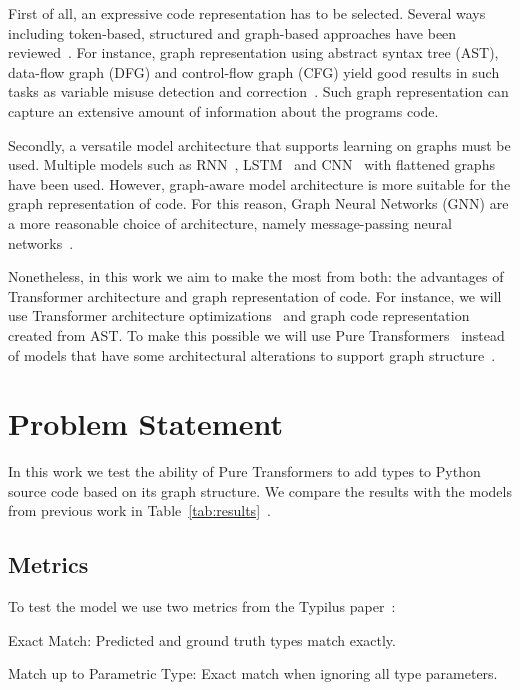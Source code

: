 \documentclass[conference]{IEEEtran}
\begin{document}
First of all, an expressive code representation has to be selected.
Several ways including token-based, structured and graph-based approaches have been reviewed~\cite{sm_avdoshin_code_2022}.
For instance, graph representation using abstract syntax tree (AST), data-flow graph (DFG) and control-flow graph (CFG)
yield good results in such tasks as variable misuse detection and correction~\cite{allamanis_learning_2017}.
Such graph representation can capture an extensive amount of information about the programs code.

Secondly, a versatile model architecture that supports learning on graphs must be used.
Multiple models such as RNN~\cite{white_deep_2016}, LSTM~\cite{wei_supervised_2017} and CNN~\cite{mou_convolutional_2016} with flattened graphs have been used.
However, graph-aware model architecture is more suitable for the graph representation of code.
For this reason, Graph Neural Networks (GNN) are a more reasonable choice of architecture,
namely message-passing neural networks~\cite{allamanis_learning_2017}.

Nonetheless, in this work we aim to make the most from both: the advantages of Transformer architecture and graph representation of code.
For instance, we will use Transformer architecture optimizations~\cite{choromanski_rethinking_2020} and graph code representation created from AST.
To make this possible we will use Pure Transformers~\cite{kim_pure_2022} instead of models that have some architectural alterations to support graph structure~\cite{kreuzer_rethinking_2021,dwivedi_generalization_2021,ying_transformers_2021}.

\section{Problem Statement}\label{sec:problem-statement}

In this work we test the ability of Pure Transformers to add types to Python source code based on its graph structure.
We compare the results with the models from previous work in Table~\ref{tab:results}~\cite{allamanis2020typilus}.

\subsection{Metrics}\label{subsec:metrics}

To test the model we use two metrics from the Typilus paper~\cite{allamanis2020typilus}:

\begin{description}
    \item{Exact Match: Predicted and ground truth types match exactly.}
    \item{Match up to Parametric Type: Exact match when ignoring all type parameters.}
\end{description}
\end{document}
